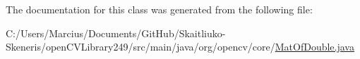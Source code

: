 The documentation for this class was generated from the following file\+:\begin{DoxyCompactItemize}
\item 
C\+:/\+Users/\+Marcius/\+Documents/\+Git\+Hub/\+Skaitliuko-\/\+Skeneris/open\+C\+V\+Library249/src/main/java/org/opencv/core/\mbox{\hyperlink{_mat_of_double_8java}{Mat\+Of\+Double.\+java}}\end{DoxyCompactItemize}

